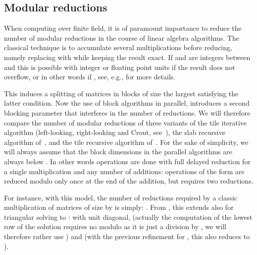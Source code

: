\documentclass{article}
\begin{document}
 

 
 
 

 
 

\subsection{Modular reductions}
\label{sec:modcount}
When computing over finite field, it is of paramount importance to
reduce the number of modular reductions in the course of linear algebra
algorithms. The classical technique is to accumulate several
multiplications before reducing, namely replacing 
 with  while keeping
the result exact. If  and  are integers between  and
 this is possible with integer or floating point units if the
result does not overflow, or in other words if
, see, e.g., \cite{DGP08} for more
details. 

This induces a splitting of matrices in blocks of size the largest  satisfying
the latter condition. Now the use of block algorithms in parallel, introduces a
second blocking parameter that interferes in the number of reductions.
We will therefore compare the number of modular reductions of three variants of
the tile iterative algorithm (left-looking, right-looking and Crout, see~\cite{DDSV98}), the slab
recursive algorithm of~\cite{DGP08}, and the tile recursive algorithm of~\cite{DPS13}.
For the sake of simplicity, we will always assume that the block dimensions in the
parallel algorithms are always below . In other words operations are done with full
delayed reduction for a single multiplication and any number of
additions: operations of the form  are reduced modulo
 only once at the end of the addition, but  requires two
reductions.
 
 
 
 
 
 
 
 
 
 
 
 
 
For instance, with this model, the number of reductions required by a
classic multiplication of matrices of size  by 
is simply: .
From \cite[Theorem~3]{DPS13}, this extends also for triangular solving  to : with
unit diagonal,  (actually the computation of the lowest row of
the solution requires no modulo as it is just a division by , we will
therefore rather use ) 
and  (with the previous refinement for
, this also reduces to ).
 
 
 
\end{document}
